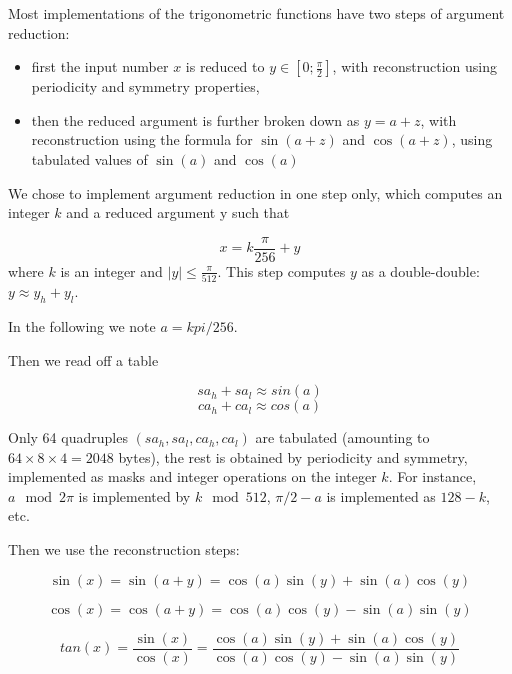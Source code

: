 Most implementations of the trigonometric functions have two steps of argument reduction: 
\begin{itemize}
\item first the input number $x$ is reduced to $y\in
  [0;\frac{\pi}{2}]$, with reconstruction using periodicity and
  symmetry properties,
\item then the reduced argument is further broken down as $y=a+z$,
  with reconstruction using the formula for $\sin(a+z)$ and
  $\cos(a+z)$, using tabulated values of $\sin(a)$ and
  $\cos(a)$
\end{itemize}

We chose to implement argument reduction in one step only, which
computes an integer $k$ and a reduced argument y such that

\begin{equation}
  x = k\frac{\pi}{256} + y\label{eq:trigoargred}
\end{equation}
where $k$ is an integer and  $ |y| \leq \frac{\pi}{512}$.
This step computes $y$ as a double-double: $y\approx y_h+y_l$. 

In the following we note $a=kpi/256$. 

Then we read off a table 

$$sa_h+sa_l \approx sin(a)$$
$$ca_h+ca_l \approx cos(a)$$

Only 64 quadruples $(sa_h,sa_l,ca_h,ca_l)$ are tabulated (amounting to
$64\times 8 \times 4 = 2048$ bytes), the rest is obtained by
periodicity and symmetry, implemented as masks and integer operations
on the integer $k$. For instance,  $a \mod 2\pi$ is implemented by $k \mod 512$,
$\pi/2-a$ is implemented as $128-k$, etc.



Then we use the reconstruction steps:

\begin{equation}        
  \sin(x) = \sin(a + y) =  \cos(a) \sin(y) +  \sin(a) \cos(y) 
  \label{eq:sinapy}
\end{equation}

\begin{equation}
  \cos(x) = \cos(a + y) = \cos(a) \cos(y) -  \sin(a) \sin(y) 
  \label{eq:cosapy}
\end{equation}

\begin{equation} 
  tan(x) = \frac{\sin(x)}{\cos(x)} = \frac{\cos(a) \sin(y) +  \sin(a) \cos(y)}{\cos(a) \cos(y) -  \sin(a) \sin(y)}
  \label{eq:tanapy}
\end{equation}


